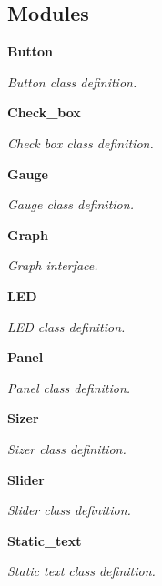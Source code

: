 \subsection*{Modules}
\begin{DoxyCompactItemize}
\item 
\textbf{ Button}
\begin{DoxyCompactList}\small\item\em Button class definition. \end{DoxyCompactList}\item 
\textbf{ Check\+\_\+box}
\begin{DoxyCompactList}\small\item\em Check box class definition. \end{DoxyCompactList}\item 
\textbf{ Gauge}
\begin{DoxyCompactList}\small\item\em Gauge class definition. \end{DoxyCompactList}\item 
\textbf{ Graph}
\begin{DoxyCompactList}\small\item\em Graph interface. \end{DoxyCompactList}\item 
\textbf{ L\+ED}
\begin{DoxyCompactList}\small\item\em L\+ED class definition. \end{DoxyCompactList}\item 
\textbf{ Panel}
\begin{DoxyCompactList}\small\item\em Panel class definition. \end{DoxyCompactList}\item 
\textbf{ Sizer}
\begin{DoxyCompactList}\small\item\em Sizer class definition. \end{DoxyCompactList}\item 
\textbf{ Slider}
\begin{DoxyCompactList}\small\item\em Slider class definition. \end{DoxyCompactList}\item 
\textbf{ Static\+\_\+text}
\begin{DoxyCompactList}\small\item\em Static text class definition. \end{DoxyCompactList}\end{DoxyCompactItemize}
